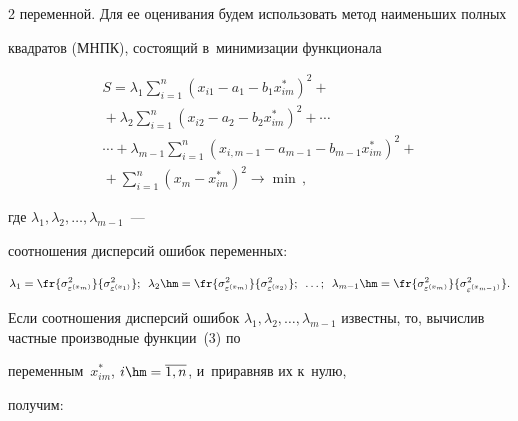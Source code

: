 \begin{multicols}{2}
переменной. Для ее оценивания будем использовать метод наименьших полных 


квад\-ра\-тов (МНПК), состоящий в~минимизации функционала


\begin{multline}


S=\lambda_1\sum\limits^n_{i=1} \left( x_{i1}-a_1-b_1x^*_{im}\right)^2+{}\\


{}+


\lambda_2\sum\limits^n_{i=1}\left( x_{i2}-a_2-b_2x^*_{im}\right)^2+\cdots\\


\cdots+ \lambda_{m-1} \sum\limits^n_{i=1} \left( x_{i,m-1}-a_{m-1}-b_{m-1} 


x^*_{im}\right)^2+{}\\


{}+


\sum\limits^n_{i=1} \left( x_m-x^*_{im}\right)^2 \to \min\,,


\label{e3-baz}


\end{multline}


где $\lambda_1, \lambda_2, \ldots, \lambda_{m-1}$~---


соотношения дисперсий ошибок переменных:


$$


\lambda_1=\fr{\sigma^2_{\varepsilon^{(x_m)}}}


{\sigma^2_{\varepsilon^{(x_1)}}}; \enskip


\lambda_2\hm=\fr{\sigma^2_{\varepsilon^{(x_m)}}}


{\sigma^2_{\varepsilon^{(x_2)}}}; \enskip\ldots;  \enskip 


\lambda_{m-1}\hm= \fr{\sigma^2_{\varepsilon^{(x_m)}}}


{\sigma^2_{\varepsilon^{(x_{m-1})}}}.


$$





    


    Если соотношения дисперсий ошибок $\lambda_1, \lambda_2, \ldots , 


\lambda_{m-1}$ известны, то, вычислив частные производные функции~(3) по 


переменным~$x^*_{im}$, $i\hm=\overline{1,n}$, и~приравняв их к~нулю, 


получим:


    \begin{multline}



\end{multline}
\end{multicols}
